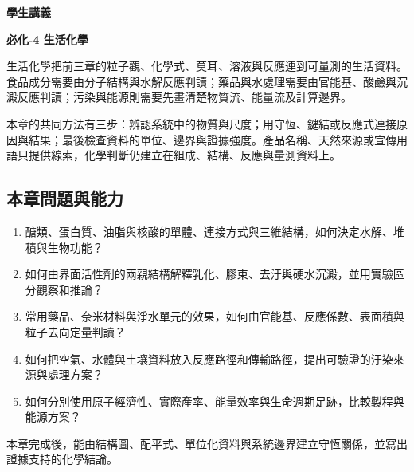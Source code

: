 \documentclass[11pt,a4paper]{article}
\providecommand{\tightlist}{%
  \setlength{\itemsep}{0pt}\setlength{\parskip}{0pt}}
\begin{document}
\begin{tcolorbox}[
  enhanced,colback=white,colframe=HandoutBlue,boxrule=1.1pt,arc=2mm,
  borderline west={3pt}{0pt}{HandoutBlue},left=5mm,right=4mm,top=4mm,bottom=4mm
]
{\sffamily\small\bfseries\color{HandoutBlue}學生講義}\par
{\sffamily\bfseries\LARGE\color{HandoutInk}必化-4 生活化學}\par
\vspace{0.35em}{\large 由分子結構、反應計量與系統邊界判讀食品、藥物、材料、水質、污染與能源}\par
{}\par
{}\par
\end{tcolorbox}


生活化學把前三章的粒子觀、化學式、莫耳、溶液與反應連到可量測的生活資料。食品成分需要由分子結構與水解反應判讀；藥品與水處理需要由官能基、酸鹼與沉澱反應判讀；污染與能源則需要先畫清楚物質流、能量流及計算邊界。

本章的共同方法有三步：辨認系統中的物質與尺度；用守恆、鍵結或反應式連接原因與結果；最後檢查資料的單位、邊界與證據強度。產品名稱、天然來源或宣傳用語只提供線索，化學判斷仍建立在組成、結構、反應與量測資料上。

\begin{HandoutLearningMap}

\subsection{本章問題與能力}\label{ux672cux7ae0ux554fux984cux8207ux80fdux529b}

\begin{enumerate}
\def\labelenumi{\arabic{enumi}.}
\tightlist
\item
  醣類、蛋白質、油脂與核酸的單體、連接方式與三維結構，如何決定水解、堆積與生物功能？
\item
  如何由界面活性劑的兩親結構解釋乳化、膠束、去汙與硬水沉澱，並用實驗區分觀察和推論？
\item
  常用藥品、奈米材料與淨水單元的效果，如何由官能基、反應係數、表面積與粒子去向定量判讀？
\item
  如何把空氣、水體與土壤資料放入反應路徑和傳輸路徑，提出可驗證的汙染來源與處理方案？
\item
  如何分別使用原子經濟性、實際產率、能量效率與生命週期足跡，比較製程與能源方案？
\end{enumerate}

本章完成後，能由結構圖、配平式、單位化資料與系統邊界建立守恆關係，並寫出證據支持的化學結論。

\end{HandoutLearningMap}
\end{document}
